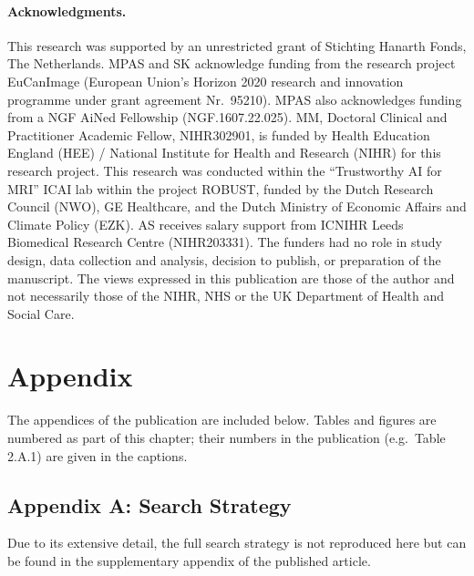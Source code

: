 \paragraph{Acknowledgments.}
This research was supported by an unrestricted grant of Stichting Hanarth Fonds, The Netherlands.
MPAS and SK acknowledge funding from the research project EuCanImage (European Union's Horizon 2020 research and innovation programme under grant agreement Nr.\ 95210).
MPAS also acknowledges funding from a NGF AiNed Fellowship (NGF.1607.22.025).
MM, Doctoral Clinical and Practitioner Academic Fellow, NIHR302901, is funded by Health Education England (HEE) / National Institute for Health and Research (NIHR) for this research project.
This research was conducted within the ``Trustworthy AI for MRI'' ICAI lab within the project ROBUST, funded by the Dutch Research Council (NWO), GE Healthcare, and the Dutch Ministry of Economic Affairs and Climate Policy (EZK).
AS receives salary support from ICNIHR Leeds Biomedical Research Centre (NIHR203331).
The funders had no role in study design, data collection and analysis, decision to publish, or preparation of the manuscript.
The views expressed in this publication are those of the author and not necessarily those of the NIHR, NHS or the UK Department of Health and Social Care.

\clearpage
\section{Appendix}
\label{sec:ch1_appendix}
The appendices of the publication are included below.
Tables and figures are numbered as part of this chapter; their numbers in the publication (e.g.\ Table 2.A.1) are given in the captions.

\subsection{Appendix A: Search Strategy}
\label{sec:ch1_appA}
Due to its extensive detail, the full search strategy is not reproduced here but can be found in the supplementary appendix of the published article.

